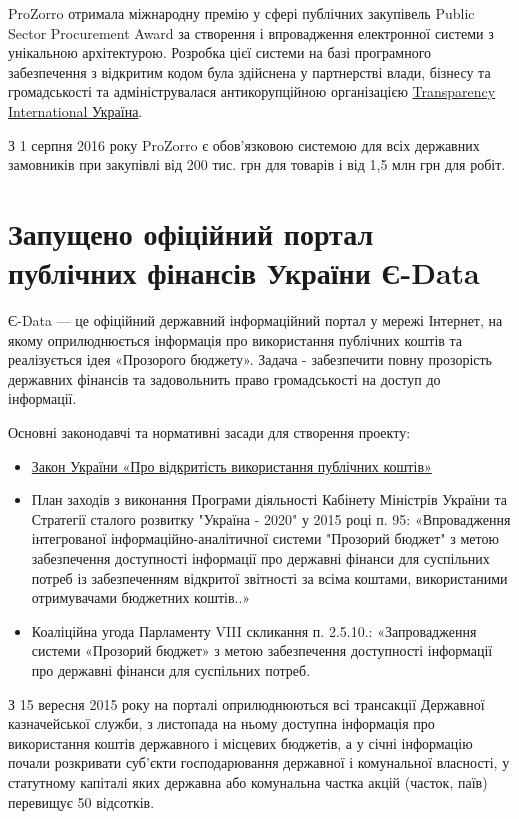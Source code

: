 ProZorro отримала міжнародну премію у сфері публічних закупівель Public Sector Procurement Award за створення і впровадження електронної системи з унікальною архітектурою. Розробка цієї системи на базі програмного забезпечення з відкритим кодом була здійснена у партнерстві влади, бізнесу та громадськості та адмініструвалася антикорупційною організацією \href{https://uk.wikipedia.org/wiki/%D0%A2%D1%80%D0%B0%D0%BD%D1%81%D0%BF%D0%B5%D1%80%D0%B5%D0%BD%D1%81%D1%96_%D0%86%D0%BD%D1%82%D0%B5%D1%80%D0%BD%D0%B5%D1%88%D0%BD}{Transparency International Україна}.

З 1 серпня 2016 року ProZorro є обов'язковою системою для всіх державних замовників при закупівлі від 200 тис. грн для товарів і від 1,5 млн грн для робіт.

\section{Запущено офіційний портал публічних фінансів України Є-Data}

Є-Data — це офіційний державний інформаційний портал у мережі Інтернет, на якому оприлюднюється інформація про використання публічних коштів та реалізується ідея «Прозорого бюджету». Задача - забезпечити повну прозорість державних фінансів та задовольнить право громадськості на доступ до інформації.

Основні законодавчі та нормативні засади для створення проекту:

\begin{itemize}
    \item \href{http://zakon3.rada.gov.ua/laws/show/183-19}{Закон України «Про відкритість використання публічних коштів»}
    \item План заходів з виконання Програми діяльності Кабінету Міністрів України та Стратегії сталого розвитку "Україна - 2020" у 2015 році п. 95: «Впровадження інтегрованої інформаційно-аналітичної системи "Прозорий бюджет" з метою забезпечення доступності інформації про державні фінанси для суспільних потреб із забезпеченням відкритої звітності за всіма коштами, використаними отримувачами бюджетних коштів..»
    \item Коаліційна угода Парламенту VIII скликання п. 2.5.10.: «Запровадження системи «Прозорий бюджет» з метою забезпечення доступності інформації про державні фінанси для суспільних потреб.
\end{itemize}

З 15 вересня 2015 року на порталі оприлюднюються всі трансакції Державної казначейської служби, з листопада на ньому доступна інформація про використання коштів державного і місцевих бюджетів, а у січні інформацію почали розкривати суб'єкти господарювання державної і комунальної власності, у статутному капіталі яких державна або комунальна частка акцій (часток, паїв) перевищує 50 відсотків.

